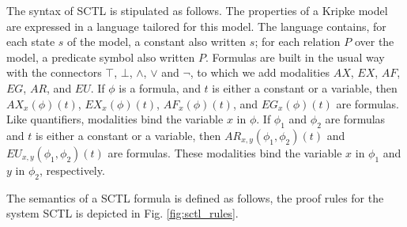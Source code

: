\documentclass[runningheads]{llncs}
\begin{document}
The syntax of \textsf{SCTL} is stipulated as follows.
The properties of a Kripke model are expressed in a language tailored for this model.
The language contains,
for each state $s$ of the model, a constant also written $s$; 
for each relation $P$ over the model, a predicate symbol also written $P$.
Formulas are built in the usual way with the connectors $\top$, $\bot$, $\wedge$, $\vee$ and $\neg$, to which we add modalities $AX$, $EX$, $AF$, $EG$, $AR$, and $EU$. If $\phi$ is a formula, and $t$ is either a constant or a variable, then $AX_x(\phi)(t)$, $EX_x(\phi)(t)$, $AF_x(\phi)(t)$, and $EG_x(\phi)(t)$ are formulas. Like quantifiers, modalities bind the variable $x$ in $\phi$. If $\phi_1$ and $\phi_2$ are formulas and $t$ is either a constant or a variable, then $AR_{x,y}(\phi_1,\phi_2)(t)$ and $EU_{x,y}(\phi_1,\phi_2)(t)$ are formulas. These modalities bind the variable $x$ in $\phi_1$ and $y$ in $\phi_2$, respectively.
 
The semantics of a \textsf{SCTL} formula is defined as follows, 
the proof rules for the system \textsf{SCTL} is depicted in Fig. \ref{fig:sctl_rules}.
 
\end{document}
